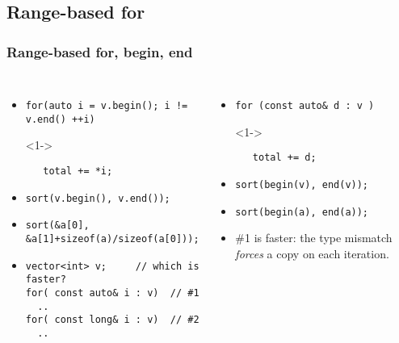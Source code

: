 
\subsection{Range-based for} \lyxframeend{}

\begin{frame}[fragile]
\frametitle{Range-based for, begin, end}

\begin{columns}[t]

\begin{itemize}
\item  <1->{\scriptsize\begin{verbatim}for(auto i = v.begin(); i != v.end() ++i)   \end{verbatim}}
\item[]<1->{\scriptsize\begin{verbatim}   total += *i; \end{verbatim}}
\item<2->{\scriptsize\begin{verbatim}sort(v.begin(), v.end());  \end{verbatim}}
\item<3->{\scriptsize\begin{verbatim}sort(&a[0], &a[1]+sizeof(a)/sizeof(a[0]));  \end{verbatim}}

\item<4-> {\scriptsize
\begin{verbatim}
vector<int> v;     // which is faster?
for( const auto& i : v)  // #1
  ..
for( const long& i : v)  // #2
  ..
\end{verbatim}
}

\end{itemize}

\begin{itemize}
\item  <1->{\scriptsize\begin{verbatim}for (const auto& d : v )  \end{verbatim}}
\item[]<1->{\scriptsize\begin{verbatim}   total += d; \end{verbatim}}
\item<2->{\scriptsize\begin{verbatim}sort(begin(v), end(v));  \end{verbatim}}
\item<3->{\scriptsize\begin{verbatim}sort(begin(a), end(a));  \end{verbatim}}
\item<5-> \#1 is faster: the type mismatch \emph{forces} a copy on each iteration.
\end{itemize}

\end{columns}

\end{frame}

